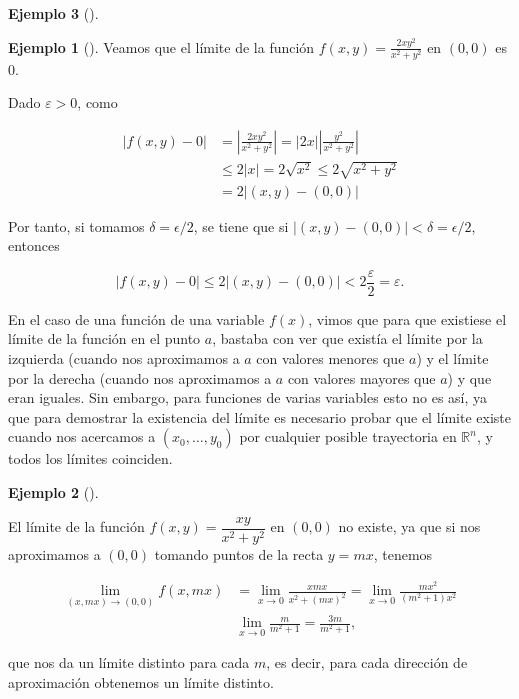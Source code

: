 \documentclass[
  a4paper,
]{scrreport}
\theoremstyle{definition}
\newtheorem{example}{Ejemplo}[chapter]
\theoremstyle{plain}
\theoremstyle{definition}
\theoremstyle{definition}
\theoremstyle{plain}
\theoremstyle{plain}
\theoremstyle{remark}
\begin{document}
\begin{example}[]
\begin{example}[]
Veamos que el límite de la función \(f(x,y)=\frac{2xy^2}{x^2+y^2}\) en
\((0,0)\) es \(0\).

Dado \(\varepsilon>0\), como

\begin{align*}
|f(x,y)-0| 
&= \left|\frac{2xy^2}{x^2+y^2}\right| 
= |2x|\left|\frac{y^2}{x^2+y^2}\right| \\
& \leq 2|x| 
= 2\sqrt{x^2}
\leq 2\sqrt{x^2+y^2} \\
&= 2|(x,y)-(0,0)|
\end{align*}

Por tanto, si tomamos \(\delta = \epsilon/2\), se tiene que si
\(|(x,y)-(0,0)|<\delta = \epsilon/2\), entonces

\[
|f(x,y)-0| \leq 2|(x,y)-(0,0)| < 2\frac{\varepsilon}{2} = \varepsilon.
\]

\end{example}

En el caso de una función de una variable \(f(x)\), vimos que para que
existiese el límite de la función en el punto \(a\), bastaba con ver que
existía el límite por la izquierda (cuando nos aproximamos a \(a\) con
valores menores que \(a\)) y el límite por la derecha (cuando nos
aproximamos a \(a\) con valores mayores que \(a\)) y que eran iguales.
Sin embargo, para funciones de varias variables esto no es así, ya que
para demostrar la existencia del límite es necesario probar que el
límite existe cuando nos acercamos a \((x_0,\ldots,y_0)\) por cualquier
posible trayectoria en \(\mathbb{R}^n\), y todos los límites coinciden.

\begin{example}[]\protect\hypertarget{exm-no-existencia-limite}{}\label{exm-no-existencia-limite}

El límite de la función \(f(x,y)=\dfrac{xy}{x^2+y^2}\) en \((0,0)\) no
existe, ya que si nos aproximamos a \((0,0)\) tomando puntos de la recta
\(y=mx\), tenemos

\begin{align*}
\lim_{(x,mx)\to(0,0)} f(x,mx) 
&= \lim_{x\to 0} \frac{xmx}{x^2+(mx)^2} 
= \lim_{x\to 0} \frac{mx^2}{(m^2+1)x^2} \\
& \lim_{x\to 0} \frac{m}{m^2+1} 
= \frac{3m}{m^2+1},
\end{align*}

que nos da un límite distinto para cada \(m\), es decir, para cada
dirección de aproximación obtenemos un límite distinto.

\end{example}


\end{example}
\end{document}
